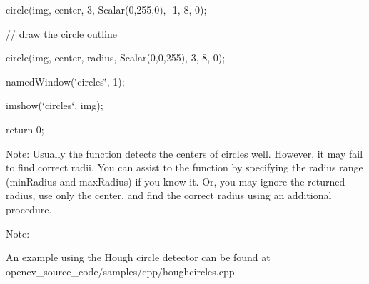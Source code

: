 {\ttfamily }

{\ttfamily circle(img, center, 3, Scalar(0,255,0), -\/1, 8, 0);}

{\ttfamily }

{\ttfamily }

{\ttfamily // draw the circle outline}

{\ttfamily }

{\ttfamily }

{\ttfamily circle(img, center, radius, Scalar(0,0,255), 3, 8, 0);}

{\ttfamily }

{\ttfamily }

{\ttfamily named\+Window(\char`\"{}circles\char`\"{}, 1);}

{\ttfamily }

{\ttfamily }

{\ttfamily imshow(\char`\"{}circles\char`\"{}, img);}

{\ttfamily }

{\ttfamily }

{\ttfamily return 0;}

{\ttfamily }

{\ttfamily }

{\ttfamily Note\+: Usually the function detects the centers of circles well. However, it may fail to find correct radii. You can assist to the function by specifying the radius range ({\ttfamily min\+Radius} and {\ttfamily max\+Radius}) if you know it. Or, you may ignore the returned radius, use only the center, and find the correct radius using an additional procedure. }

Note\+:


\begin{DoxyItemize}
\item An example using the Hough circle detector can be found at opencv\+\_\+source\+\_\+code/samples/cpp/houghcircles.\+cpp 
\end{DoxyItemize}


